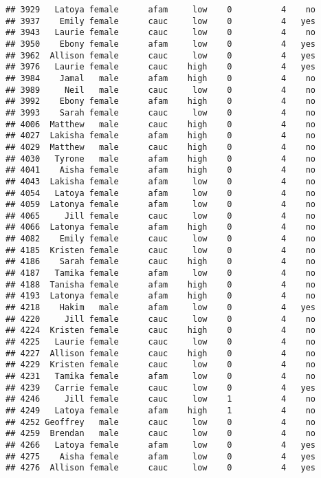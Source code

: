 \documentclass[
]{article}
\begin{document}
\begin{verbatim}
## 3929   Latoya female      afam     low    0          4    no
## 3937    Emily female      cauc     low    0          4   yes
## 3943   Laurie female      cauc     low    0          4    no
## 3950    Ebony female      afam     low    0          4   yes
## 3962  Allison female      cauc     low    0          4   yes
## 3976   Laurie female      cauc    high    0          4   yes
## 3984    Jamal   male      afam    high    0          4    no
## 3989     Neil   male      cauc     low    0          4    no
## 3992    Ebony female      afam    high    0          4    no
## 3993    Sarah female      cauc     low    0          4    no
## 4006  Matthew   male      cauc    high    0          4    no
## 4027  Lakisha female      afam    high    0          4    no
## 4029  Matthew   male      cauc    high    0          4    no
## 4030   Tyrone   male      afam    high    0          4    no
## 4041    Aisha female      afam    high    0          4    no
## 4043  Lakisha female      afam     low    0          4    no
## 4054   Latoya female      afam     low    0          4    no
## 4059  Latonya female      afam     low    0          4    no
## 4065     Jill female      cauc     low    0          4    no
## 4066  Latonya female      afam    high    0          4    no
## 4082    Emily female      cauc     low    0          4    no
## 4185  Kristen female      cauc     low    0          4    no
## 4186    Sarah female      cauc    high    0          4    no
## 4187   Tamika female      afam     low    0          4    no
## 4188  Tanisha female      afam    high    0          4    no
## 4193  Latonya female      afam    high    0          4    no
## 4218    Hakim   male      afam     low    0          4   yes
## 4220     Jill female      cauc     low    0          4    no
## 4224  Kristen female      cauc    high    0          4    no
## 4225   Laurie female      cauc     low    0          4    no
## 4227  Allison female      cauc    high    0          4    no
## 4229  Kristen female      cauc     low    0          4    no
## 4231   Tamika female      afam     low    0          4    no
## 4239   Carrie female      cauc     low    0          4   yes
## 4246     Jill female      cauc     low    1          4    no
## 4249   Latoya female      afam    high    1          4    no
## 4252 Geoffrey   male      cauc     low    0          4    no
## 4259  Brendan   male      cauc     low    0          4    no
## 4266   Latoya female      afam     low    0          4   yes
## 4275    Aisha female      afam     low    0          4   yes
## 4276  Allison female      cauc     low    0          4   yes

\end{verbatim}
\end{document}
